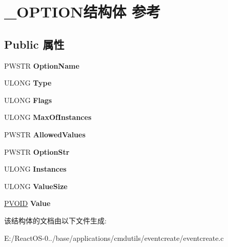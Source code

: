 \hypertarget{struct___o_p_t_i_o_n}{}\section{\+\_\+\+O\+P\+T\+I\+O\+N结构体 参考}
\label{struct___o_p_t_i_o_n}
\subsection*{Public 属性}
\begin{DoxyCompactItemize}
\item 
\mbox{\label{struct___o_p_t_i_o_n_a9cef02e4c1691c77a9c5dba2617d2a1f}} 
P\+W\+S\+TR {\bfseries Option\+Name}
\item 
\mbox{\label{struct___o_p_t_i_o_n_ae9985f7921bacd87c596c8c9ecc4a88b}} 
U\+L\+O\+NG {\bfseries Type}
\item 
\mbox{\label{struct___o_p_t_i_o_n_a8131ef90c741c9c7bf7bdc05364ca268}} 
U\+L\+O\+NG {\bfseries Flags}
\item 
\mbox{\label{struct___o_p_t_i_o_n_a0625a8315a05c938127bb3a404d5e4bb}} 
U\+L\+O\+NG {\bfseries Max\+Of\+Instances}
\item 
\mbox{\label{struct___o_p_t_i_o_n_a6b11acaf43bdfa869fa720e2756fa0bd}} 
P\+W\+S\+TR {\bfseries Allowed\+Values}
\item 
\mbox{\label{struct___o_p_t_i_o_n_aab80fd0d88cc246ee67d3e9dabe23878}} 
P\+W\+S\+TR {\bfseries Option\+Str}
\item 
\mbox{\label{struct___o_p_t_i_o_n_a3bcfdca17c872ea62aef33db38466c72}} 
U\+L\+O\+NG {\bfseries Instances}
\item 
\mbox{\label{struct___o_p_t_i_o_n_a4edd7c31e526de2641c81078eb88accc}} 
U\+L\+O\+NG {\bfseries Value\+Size}
\item 
\mbox{\label{struct___o_p_t_i_o_n_acff8caff90e7166bdb4d5706905f8411}} 
\hyperlink{interfacevoid}{P\+V\+O\+ID} {\bfseries Value}
\end{DoxyCompactItemize}


该结构体的文档由以下文件生成\+:\begin{DoxyCompactItemize}
\item 
E\+:/\+React\+O\+S-\/0../base/applications/cmdutils/eventcreate/eventcreate.\+c\end{DoxyCompactItemize}
